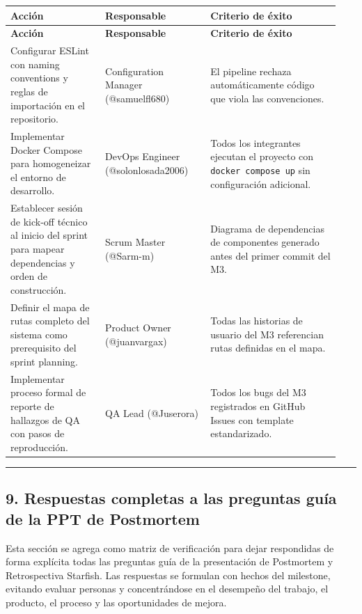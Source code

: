 \documentclass[11pt,a4paper]{article}
\begin{document}
\begingroup
\scriptsize
\setlength{\tabcolsep}{3pt}
\begin{longtable}{P{0.27\linewidth}P{0.30\linewidth}P{0.37\linewidth}}
\toprule
\textbf{Acción} & \textbf{Responsable} & \textbf{Criterio de éxito} \\
\midrule
\endfirsthead
\toprule
\textbf{Acción} & \textbf{Responsable} & \textbf{Criterio de éxito} \\
\midrule
\endhead
\bottomrule
\endlastfoot
Configurar ESLint con naming conventions y reglas de importación en el repositorio. & Configuration Manager (@samuelfl680) & El pipeline rechaza automáticamente código que viola las convenciones. \\
Implementar Docker Compose para homogeneizar el entorno de desarrollo. & DevOps Engineer (@solonlosada2006) & Todos los integrantes ejecutan el proyecto con \texttt{docker compose up} sin configuración adicional. \\
Establecer sesión de kick-off técnico al inicio del sprint para mapear dependencias y orden de construcción. & Scrum Master (@Sarm-m) & Diagrama de dependencias de componentes generado antes del primer commit del M3. \\
Definir el mapa de rutas completo del sistema como prerequisito del sprint planning. & Product Owner (@juanvargax) & Todas las historias de usuario del M3 referencian rutas definidas en el mapa. \\
Implementar proceso formal de reporte de hallazgos de QA con pasos de reproducción. & QA Lead (@Juserora) & Todos los bugs del M3 registrados en GitHub Issues con template estandarizado. \\
\end{longtable}
\endgroup

\vspace{0.6em}\hrule\vspace{0.8em}

\subsection{9. Respuestas completas a las preguntas guía de la PPT de Postmortem}

Esta sección se agrega como matriz de verificación para dejar respondidas de forma explícita todas las preguntas guía de la presentación de Postmortem y Retrospectiva Starfish. Las respuestas se formulan con hechos del milestone, evitando evaluar personas y concentrándose en el desempeño del trabajo, el producto, el proceso y las oportunidades de mejora.
\end{document}
